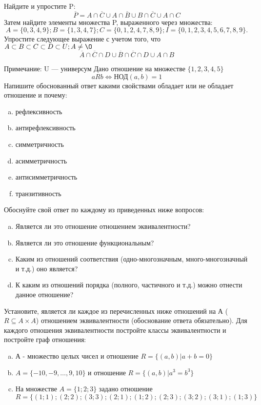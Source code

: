\documentclass[10pt]{exam}
\begin{document}
\begin{questions}
\question
Найдите и упростите P:
\begin{equation*}
\overline{P} = A \cap \overline{C} \cup A \cap \overline{B} \cup B \cap \overline{C} \cup A \cap C
\end{equation*}
Затем найдите элементы множества P, выраженного через множества:
\begin{equation*}
A = \{0, 3, 4, 9\}; 
B = \{1, 3, 4, 7\};
C = \{0, 1, 2, 4, 7, 8, 9\};
I = \{0, 1, 2, 3, 4, 5, 6, 7, 8, 9\}.
\end{equation*}\question
Упростите следующее выражение с учетом того, что $A\subset B \subset C \subset D \subset U; A \neq \O$
\begin{equation*}
\overline{A} \cap \overline{C} \cap D \cup \overline{B} \cap \overline{C} \cap D \cup A \cap B
\end{equation*}

Примечание: U — универсум\question
Дано отношение на множестве $\{1, 2, 3, 4, 5\}$ 
\begin{equation*}
aRb \iff  \text{НОД}(a,b) =1
\end{equation*}
Напишите обоснованный ответ какими свойствами обладает или не обладает отношение и почему:   
\begin{enumerate} [a)]\setcounter{enumi}{0}
\item рефлексивность
\item антирефлексивность
\item симметричность
\item асимметричность
\item антисимметричность
\item транзитивность
\end{enumerate}

Обоснуйте свой ответ по каждому из приведенных ниже вопросов:
\begin{enumerate} [a)]\setcounter{enumi}{0}
    \item Является ли это отношение отношением эквивалентности?
    \item Является ли это отношение функциональным?
    \item Каким из отношений соответствия (одно-многозначным, много-многозначный и т.д.) оно является?
    \item К каким из отношений порядка (полного, частичного и т.д.) можно отнести данное отношение?
\end{enumerate}


\question
Установите, является ли каждое из перечисленных ниже отношений на А ($R \subseteq A \times A$) отношением эквивалентности (обоснование ответа обязательно). Для каждого отношения эквивалентности 
постройте классы эквивалентности и постройте граф отношения:
\begin{enumerate}[a)]\setcounter{enumi}{0}
\item А - множество целых чисел и отношение $R = \{(a,b)|a + b = 0\}$
\item $A = \{-10, -9, …, 9, 10\}$ и отношение $R = \{(a,b)|a^{3} = b^{3}\}$
\item На множестве $A = \{1; 2; 3\}$ задано отношение $R = \{(1; 1); (2; 2); (3; 3); (2; 1); (1; 2); (2; 3); (3; 2); (3; 1); (1; 3)\}$


\end{enumerate}
\end{questions}
\end{document}
